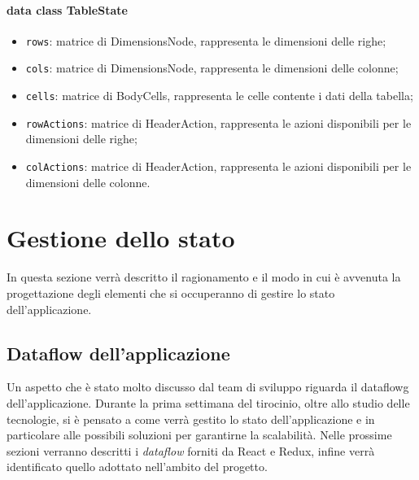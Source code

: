 \paragraph*{data class TableState}
\begin{itemize}
	\item \verb|rows|: matrice di DimensionsNode, rappresenta le dimensioni delle righe;
	\item \verb|cols|: matrice di DimensionsNode, rappresenta le dimensioni delle colonne;
	\item \verb|cells|: matrice di BodyCells, rappresenta le celle contente i dati della tabella;
	\item \verb|rowActions|: matrice di HeaderAction, rappresenta le azioni disponibili per le dimensioni delle righe;
	\item \verb|colActions|:  matrice di HeaderAction, rappresenta le azioni disponibili per le dimensioni delle colonne.
\end{itemize}

\section{Gestione dello stato}
In questa sezione verrà descritto il ragionamento e il modo in cui è avvenuta la progettazione degli elementi che si occuperanno di gestire lo stato dell'applicazione.

\subsection{Dataflow dell'applicazione}
Un aspetto che è stato molto discusso dal team di sviluppo riguarda il \gls{dataflowg} dell'applicazione. Durante la prima settimana del tirocinio, oltre allo studio delle tecnologie, si è pensato a come verrà gestito lo stato dell'applicazione e in particolare alle possibili soluzioni per garantirne la scalabilità. Nelle prossime sezioni verranno descritti i \emph{dataflow} forniti da React e Redux, infine verrà identificato quello adottato nell'ambito del progetto.

